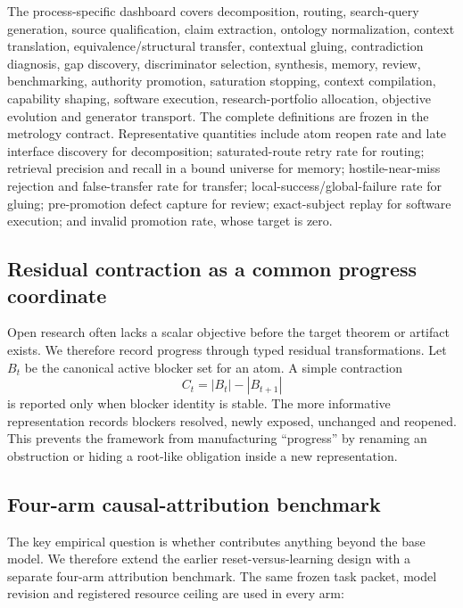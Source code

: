 The process-specific dashboard covers decomposition, routing, search-query generation, source qualification, claim extraction, ontology normalization, context translation, equivalence/structural transfer, contextual gluing, contradiction diagnosis, gap discovery, discriminator selection, synthesis, memory, review, benchmarking, authority promotion, saturation stopping, context compilation, capability shaping, software execution, research-portfolio allocation, objective evolution and generator transport. The complete definitions are frozen in the metrology contract. Representative quantities include atom reopen rate and late interface discovery for decomposition; saturated-route retry rate for routing; retrieval precision and recall in a bound universe for memory; hostile-near-miss rejection and false-transfer rate for transfer; local-success/global-failure rate for gluing; pre-promotion defect capture for review; exact-subject replay for software execution; and invalid promotion rate, whose target is zero.

\subsection{Residual contraction as a common progress coordinate}

Open research often lacks a scalar objective before the target theorem or artifact exists. We therefore record progress through typed residual transformations. Let $B_t$ be the canonical active blocker set for an atom. A simple contraction
\[
C_t=|B_t|-|B_{t+1}|
\]
is reported only when blocker identity is stable. The more informative representation records blockers resolved, newly exposed, unchanged and reopened. This prevents the framework from manufacturing ``progress'' by renaming an obstruction or hiding a root-like obligation inside a new representation.

\subsection{Four-arm causal-attribution benchmark}

The key empirical question is whether \RAKL{} contributes anything beyond the base model. We therefore extend the earlier reset-versus-learning design with a separate four-arm attribution benchmark. The same frozen task packet, model revision and registered resource ceiling are used in every arm:

